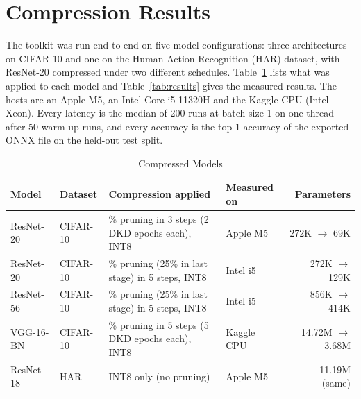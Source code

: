 \documentclass[oneside,a4paper,12pt]{report}
\begin{document}
\section{Compression Results}\label{sec:results}
The toolkit was run end to end on five model configurations: three architectures on CIFAR-10 and one on the Human Action Recognition (HAR) dataset, with ResNet-20 compressed under two different schedules. Table~\ref{tab:models} lists what was applied to each model and Table~\ref{tab:results} gives the measured results. The hosts are an Apple M5, an Intel Core i5-11320H and the Kaggle CPU (Intel Xeon). Every latency is the median of 200 runs at batch size 1 on one thread after 50 warm-up runs, and every accuracy is the top-1 accuracy of the exported ONNX file on the held-out test split.

\begin{table}[H]
\centering
\small
\begin{tabularx}{\textwidth}{@{}l l >{\raggedright\arraybackslash}X l r@{}}
\toprule
\textbf{Model} & \textbf{Dataset} & \textbf{Compression applied} & \textbf{Measured on} & \textbf{Parameters}\\
\midrule
ResNet-20 & CIFAR-10 & 50\% pruning in 3 steps (2 DKD epochs each), INT8 & Apple M5 & 272K $\to$ 69K\\
ResNet-20 & CIFAR-10 & 50\% pruning (25\% in last stage) in 5 steps, INT8 & Intel i5 & 272K $\to$ 129K\\
ResNet-56 & CIFAR-10 & 50\% pruning (25\% in last stage) in 5 steps, INT8 & Intel i5 & 856K $\to$ 414K\\
VGG-16-BN & CIFAR-10 & 50\% pruning in 5 steps (5 DKD epochs each), INT8 & Kaggle CPU & 14.72M $\to$ 3.68M\\
ResNet-18 & HAR & INT8 only (no pruning) & Apple M5 & 11.19M (same)\\
\bottomrule
\end{tabularx}
\caption{Compressed Models}
\label{tab:models}
\end{table}
\end{document}
